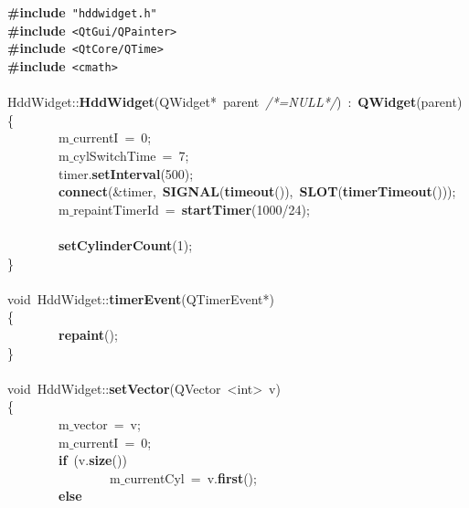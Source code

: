 \noindent
\mbox{}\textbf{\#include}\ \texttt{"{}hddwidget.h"{}} \\
\mbox{}\textbf{\#include}\ \texttt{\textless{}QtGui/QPainter\textgreater{}} \\
\mbox{}\textbf{\#include}\ \texttt{\textless{}QtCore/QTime\textgreater{}} \\
\mbox{}\textbf{\#include}\ \texttt{\textless{}cmath\textgreater{}} \\
\mbox{} \\
\mbox{}HddWidget::\textbf{HddWidget}(QWidget*\ parent\ \textit{/*=NULL*/})\ :\ \textbf{QWidget}(parent) \\
\mbox{}\{ \\
\mbox{}\ \ \ \ \ \ \ \ m$\_$currentI\ =\ 0; \\
\mbox{}\ \ \ \ \ \ \ \ m$\_$cylSwitchTime\ =\ 7; \\
\mbox{}\ \ \ \ \ \ \ \ timer.\textbf{setInterval}(500); \\
\mbox{}\ \ \ \ \ \ \ \ \textbf{connect}(\&timer,\ \textbf{SIGNAL}(\textbf{timeout}()),\ \textbf{SLOT}(\textbf{timerTimeout}())); \\
\mbox{}\ \ \ \ \ \ \ \ m$\_$repaintTimerId\ =\ \textbf{startTimer}(1000/24); \\
\mbox{} \\
\mbox{}\ \ \ \ \ \ \ \ \textbf{setCylinderCount}(1); \\
\mbox{}\} \\
\mbox{} \\
\mbox{}void\ HddWidget::\textbf{timerEvent}(QTimerEvent*) \\
\mbox{}\{ \\
\mbox{}\ \ \ \ \ \ \ \ \textbf{repaint}(); \\
\mbox{}\} \\
\mbox{} \\
\mbox{}void\ HddWidget::\textbf{setVector}(QVector\ \textless{}int\textgreater{}\ v) \\
\mbox{}\{ \\
\mbox{}\ \ \ \ \ \ \ \ m$\_$vector\ =\ v; \\
\mbox{}\ \ \ \ \ \ \ \ m$\_$currentI\ =\ 0; \\
\mbox{}\ \ \ \ \ \ \ \ \textbf{if}\ (v.\textbf{size}()) \\
\mbox{}\ \ \ \ \ \ \ \ \ \ \ \ \ \ \ \ m$\_$currentCyl\ =\ v.\textbf{first}(); \\
\mbox{}\ \ \ \ \ \ \ \ \textbf{else} \\
